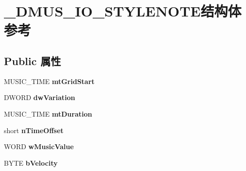 \hypertarget{struct___d_m_u_s___i_o___s_t_y_l_e_n_o_t_e}{}\section{\+\_\+\+D\+M\+U\+S\+\_\+\+I\+O\+\_\+\+S\+T\+Y\+L\+E\+N\+O\+T\+E结构体 参考}
\label{struct___d_m_u_s___i_o___s_t_y_l_e_n_o_t_e}
\subsection*{Public 属性}
\begin{DoxyCompactItemize}
\item 
\mbox{\label{struct___d_m_u_s___i_o___s_t_y_l_e_n_o_t_e_a43966ca9d31b36c91e6826b3a552471b}} 
M\+U\+S\+I\+C\+\_\+\+T\+I\+ME {\bfseries mt\+Grid\+Start}
\item 
\mbox{\label{struct___d_m_u_s___i_o___s_t_y_l_e_n_o_t_e_a49540708d89cb4bba5617cb3f0824d0b}} 
D\+W\+O\+RD {\bfseries dw\+Variation}
\item 
\mbox{\label{struct___d_m_u_s___i_o___s_t_y_l_e_n_o_t_e_a7debb887259e17a92a07304808e2d1e1}} 
M\+U\+S\+I\+C\+\_\+\+T\+I\+ME {\bfseries mt\+Duration}
\item 
\mbox{\label{struct___d_m_u_s___i_o___s_t_y_l_e_n_o_t_e_aa047d4ba1056ac36f6f3196ce7efb218}} 
short {\bfseries n\+Time\+Offset}
\item 
\mbox{\label{struct___d_m_u_s___i_o___s_t_y_l_e_n_o_t_e_a84635f76ef091470afd90d5fb09ebd72}} 
W\+O\+RD {\bfseries w\+Music\+Value}
\item 
\mbox{\label{struct___d_m_u_s___i_o___s_t_y_l_e_n_o_t_e_a106aa8d3b4ffbdde0feae9bf6a164fd2}} 
B\+Y\+TE {\bfseries b\+Velocity}
\item 
\mbox{\label{struct___d_m_u_s___i_o___s_t_y_l_e_n_o_t_e_a839f33a83a5599b78e35a5e579f3e328}} 

\end{DoxyCompactItemize}
